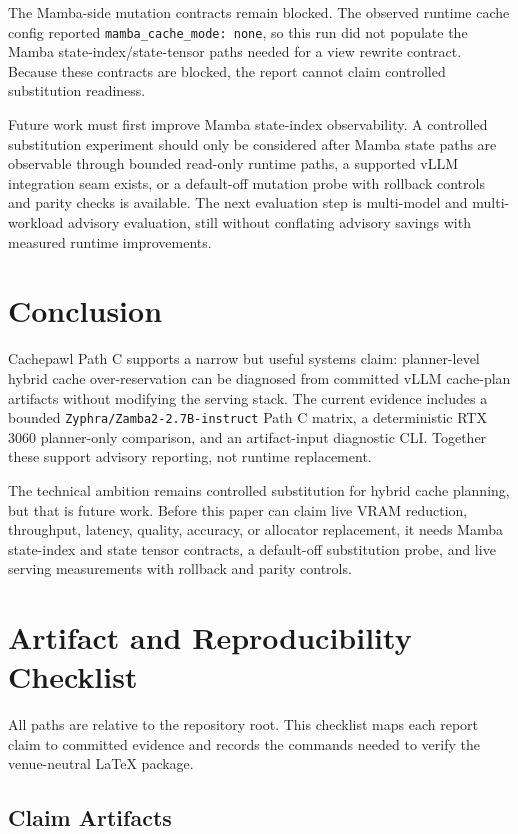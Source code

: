 \documentclass[11pt]{article}
\begin{document}
The Mamba-side mutation contracts remain blocked. The observed runtime cache
config reported \texttt{mamba\_cache\_mode: none}, so this run did not populate
the Mamba state-index/state-tensor paths needed for a view rewrite contract.
Because these contracts are blocked, the report cannot claim controlled
substitution readiness.

Future work must first improve Mamba state-index observability. A controlled
substitution experiment should only be considered after Mamba state paths are
observable through bounded read-only runtime paths, a supported vLLM integration
seam exists, or a default-off mutation probe with rollback controls and parity
checks is available. The next evaluation step is multi-model and
multi-workload advisory evaluation, still without conflating advisory savings
with measured runtime improvements.

\section{Conclusion}

Cachepawl Path C supports a narrow but useful systems claim: planner-level
hybrid cache over-reservation can be diagnosed from committed vLLM cache-plan
artifacts without modifying the serving stack. The current evidence includes a
bounded \texttt{Zyphra/Zamba2-2.7B-instruct} Path C matrix, a deterministic RTX
3060 planner-only comparison, and an artifact-input diagnostic CLI. Together
these support advisory reporting, not runtime replacement.

The technical ambition remains controlled substitution for hybrid cache
planning, but that is future work. Before this paper can claim live VRAM
reduction, throughput, latency, quality, accuracy, or allocator replacement, it
needs Mamba state-index and state tensor contracts, a default-off substitution
probe, and live serving measurements with rollback and parity controls.

\appendix
\section{Artifact and Reproducibility Checklist}

All paths are relative to the repository root. This checklist maps each report
claim to committed evidence and records the commands needed to verify the
venue-neutral LaTeX package.

\subsection{Claim Artifacts}
\end{document}
